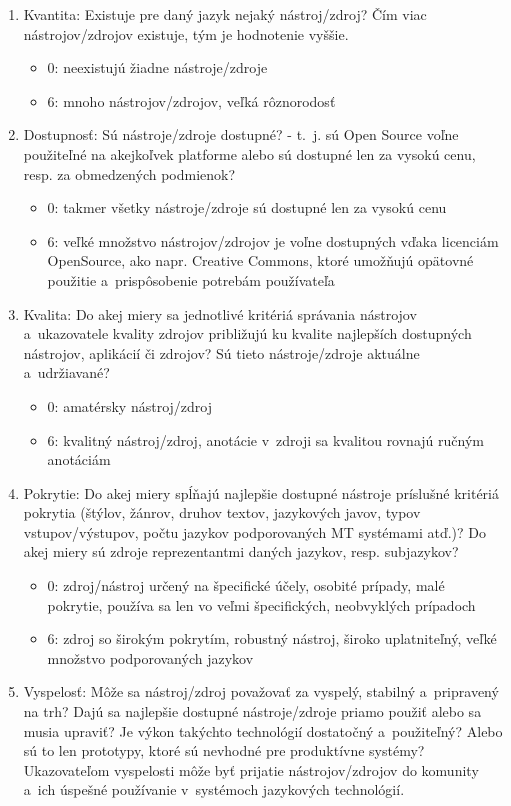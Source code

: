 \begin{multicols}{2}
\begin{enumerate}
\item Kvantita: Existuje pre daný jazyk nejaký nástroj/zdroj? Čím viac nástrojov/zdrojov existuje, tým je hodnotenie vyššie.
\begin{itemize}
\item 0: neexistujú žiadne nástroje/zdroje
\item 6: mnoho nástrojov/zdrojov, veľká rôznorodosť
\end{itemize}
\item Dostupnosť: Sú nástroje/zdroje dostupné? - t.~j. sú Open Source voľne použiteľné na akejkoľvek platforme alebo sú dostupné len za vysokú cenu, resp. za obmedzených podmienok?
\begin{itemize}
\item 0: takmer všetky nástroje/zdroje sú dostupné len za vysokú cenu
\item 6: veľké množstvo nástrojov/zdro\-jov je voľne dostupných vďaka licenciám OpenSource, ako napr. Creative Commons, ktoré umožňujú opätovné použitie a~prispôsobenie potrebám používateľa\cite{f31}
\end{itemize}
\item Kvalita: Do akej miery sa jednotlivé kritériá správania nástrojov a~ukazovatele kvality zdrojov približujú ku kvalite najlepších dostupných nástrojov, aplikácií či zdrojov? Sú tieto nástroje/zdroje aktuálne a~udržiavané?
\begin{itemize}
\item 0: amatérsky nástroj/zdroj
\item 6: kvalitný nástroj/zdroj, anotácie v~zdroji sa kvalitou rovnajú ručným anotáciám
\end{itemize}
\item Pokrytie: Do akej miery spĺňajú najlepšie dostupné nástroje príslušné kritériá pokrytia (štýlov, žánrov, druhov textov, jazykových javov, typov vstupov/výstupov, počtu jazykov podporovaných MT systémami atď.)? Do akej miery sú zdroje reprezentantmi daných jazykov, resp. subjazykov?
\begin{itemize}
\item 0: zdroj/nástroj určený na špecifické účely, osobité prípady, malé pokrytie, používa sa len vo veľmi špecifických, neobvyklých prípadoch
\item 6: zdroj so širokým pokrytím, robustný nástroj, široko uplatniteľný, veľké množstvo podporovaných jazykov
\end{itemize}
\item Vyspelosť: Môže sa nástroj/zdroj považovať za vyspelý, stabilný a~pripravený na trh? Dajú sa najlepšie dostupné nástroje/zdroje priamo použiť alebo sa musia upraviť? Je výkon takýchto technológií dostatočný a~použiteľný? Alebo sú to len prototypy, ktoré sú nevhodné pre produktívne systémy? Ukazovateľom vyspelosti môže byť prijatie nástrojov/zdrojov do komunity a~ich úspešné používanie v~systémoch jazykových technológií.

\end{enumerate}
\end{multicols}
